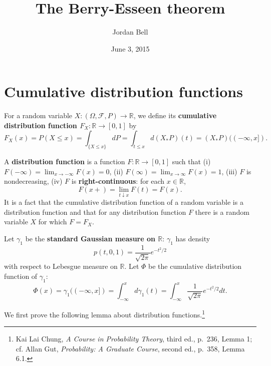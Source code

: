 \documentclass{article}
\theoremstyle{definition}
\begin{document}
\title{The Berry-Esseen theorem}
\author{Jordan Bell}
\date{June 3, 2015}

\maketitle

\section{Cumulative distribution functions}
For a random variable $X:(\Omega,\mathscr{F},P) \to \mathbb{R}$, we define its \textbf{cumulative distribution function $F_X:\mathbb{R} \to
[0,1]$} by
\[
F_X(x) = P(X \leq x) = \int_{\{X \leq x\}} dP = \int_{t \leq x} d(X_*P)(t)
=(X_*P)((-\infty,x]).
\]

A \textbf{distribution function} is a function $F:\mathbb{R} \to [0,1]$ such that (i)
$F(-\infty)=\lim_{x \to -\infty} F(x)=0$,
(ii) $F(\infty) = \lim_{x \to \infty} F(x)=1$,
(iii) $F$ is nondecreasing,
(iv) $F$ is \textbf{right-continuous}: for each $x \in \mathbb{R}$,
\[
F(x+)=\lim_{t \downarrow x} F(t) = F(x).
\] 
It is a fact that the
cumulative distribution function of a random variable is a distribution function and that for any
distribution function $F$ there is a random variable $X$ for which $F=F_X$. 

Let $\gamma_1$ be the \textbf{standard Gaussian measure on $\mathbb{R}$}: $\gamma_1$ has density
\[
p(t,0,1) = \frac{1}{\sqrt{2\pi}} e^{-t^2/2}
\]
with respect to Lebesgue measure on $\mathbb{R}$. 
Let $\Phi$ be the cumulative distribution function of $\gamma_1$:
\[
\Phi(x) =  \gamma_1((-\infty,x]) = \int_{-\infty}^x d\gamma_1(t) = 
\int_{-\infty}^x \frac{1}{\sqrt{2\pi}} e^{-t^2/2} dt.
\]



We first prove the following lemma about distribution functions.\footnote{Kai Lai Chung,
{\em A Course in Probability Theory}, third ed.,
p.~236, Lemma 1; cf. Allan Gut, {\em Probability: A Graduate Course}, second ed., p.~358, Lemma 6.1.}
\end{document}
